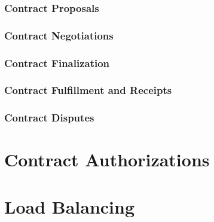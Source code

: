 \documentclass{article}
\begin{document}
\subsubsection{Contract Proposals}
\subsubsection{Contract Negotiations}
\subsubsection{Contract Finalization}
\subsubsection{Contract Fulfillment and Receipts}
\subsubsection{Contract Disputes}

\section{Contract Authorizations}

\section{Load Balancing}



\end{document}
